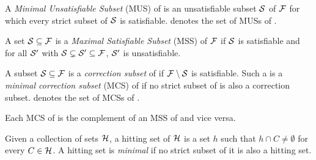 \begin{definition}

  A \emph{Minimal Unsatisfiable Subset} (MUS) of 
  \F is an unsatisfiable subset $\mathcal{S}$ of $\mathcal{F} $ for which every strict subset of $\mathcal{S} $ is satisfiable. 
%   
  \muses{\F} denotes the set of MUSs of \F. 
\end{definition}



\begin{definition}
    A set $\mathcal{S} \subseteq \mathcal{F} $ is a \emph{Maximal Satisfiable Subset} (MSS) of $ \mathcal{F} $ if $\mathcal{S}$ is satisfiable and for all $\mathcal{S}'$ with $\mathcal{S}  \subsetneq  \mathcal{S}'\subseteq\mathcal{F}  $, $\mathcal{S}'$ is unsatisfiable.
\end{definition}

\begin{definition}
    A subset $\mathcal{S} \subseteq \mathcal{F} $ is a \emph{correction subset} of \formula if $\mathcal{F} \setminus\mathcal{S}$ is satisfiable. 
    Such a  is a \emph{minimal correction subset} (MCS)  of \formula if no strict subset of  is also a correction subset. 
    \mcses{\F} denotes the set of MCSs of \F. 
\end{definition}

Each  MCS of \formula is the complement of an MSS of \formula and vice versa. 

\begin{definition}\label{def:minimal-hs}
    Given a collection of sets $\mathcal{H}$, a hitting set of $\mathcal{H}$ is a set $h$ such that  $h \cap C \neq \emptyset$ for every $C \in \mathcal{H}$. A hitting set is \emph{minimal} if no strict subset of it is also a hitting set.
\end{definition}


